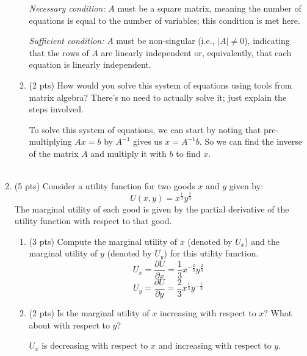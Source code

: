 \documentclass{./../../../Latex/tests}
\begin{document}
\begin{enumerate}
\begin{enumerate}
\textit{Necessary condition:} $A$ must be a square matrix, meaning the number of equations is equal to the number of variables; this condition is met here.

\textit{Sufficient condition:} $A$ must be non-singular (i.e., $|A| \neq 0$), indicating that the rows of $A$ are linearly independent or, equivalently, that each equation is linearly independent. \\

\item (2 pts) How would you solve this system of equations using tools from matrix algebra? There's no need to actually solve it; just explain the steps involved.

To solve this system of equations, we can start by noting that pre-multiplying $Ax =b$ by $A^{-1}$ gives us $x = A^{-1} b$. So we can find the inverse of the matrix $A$ and multiply it with $b$ to find $x$. \\~\\
\end{enumerate}


\item (5 pts) Consider a utility function for two goods \( x \) and \( y \) given by:
\[
U(x, y) = x^{\frac{1}{3}}y^{\frac{2}{3}}
\]
The marginal utility of each good is given by the partial derivative of the utility function with respect to that good.
\begin{enumerate}
  \item (3 pts) Compute the marginal utility of \( x \) (denoted by \( U_x \)) and the marginal utility of \( y \) (denoted by \( U_y \)) for this utility function.
  \[
  U_x = \frac{\partial U}{\partial x} = \frac{1}{3} x^{-\frac{2}{3}} y^{\frac{2}{3}}
  \]
   \[
  U_y = \frac{\partial U}{\partial y} = \frac{2}{3} x^{\frac{1}{3}} y^{-\frac{1}{3}}
  \]
  \item (2 pts) Is the marginal utility of \( x \) increasing with respect to \( x \)? What about with respect to \( y \)?
  
  $U_x$ is decreasing with respect to \( x \) and increasing with respect to \( y \).
\end{enumerate}


\end{enumerate}
\end{document}
